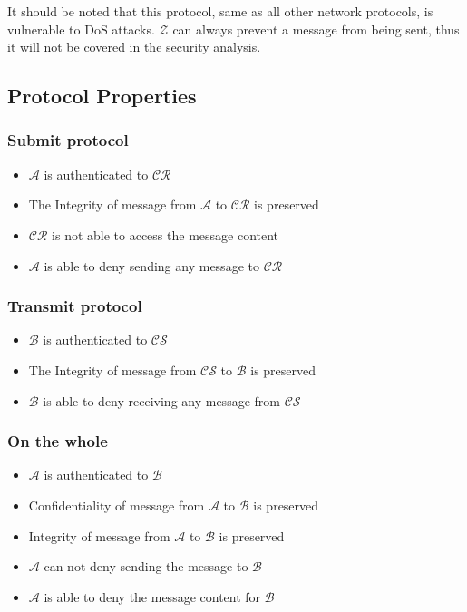 It should be noted that this protocol, same as all other network protocols, is vulnerable to DoS attacks. $\mathcal{Z}$ can always prevent a message from being sent, thus it will not be covered in the security analysis.

\subsection*{Protocol Properties}
\subsubsection*{Submit protocol}
\begin{itemize}
\item $\mathcal{A}$ is authenticated to $\mathcal{CR}$
\item The Integrity of message from $\mathcal{A}$ to $\mathcal{CR}$ is preserved
\item $\mathcal{CR}$ is not able to access the message content
\item $\mathcal{A}$ is able to deny sending any message to $\mathcal{CR}$
\end{itemize}

\subsubsection*{Transmit protocol}
\begin{itemize}
\item $\mathcal{B}$ is authenticated to $\mathcal{CS}$
\item The Integrity of message from $\mathcal{CS}$ to $\mathcal{B}$ is preserved
\item $\mathcal{B}$ is able to deny receiving any message from $\mathcal{CS}$
\end{itemize}

\subsubsection*{On the whole}
\begin{itemize}
\item $\mathcal{A}$ is authenticated to $\mathcal{B}$
\item Confidentiality of message from $\mathcal{A}$ to $\mathcal{B}$ is preserved
\item Integrity of message from $\mathcal{A}$ to $\mathcal{B}$ is preserved
\item $\mathcal{A}$ can not deny sending the message to $\mathcal{B}$
\item $\mathcal{A}$ is able to deny the message content for $\mathcal{B}$
\end{itemize}

